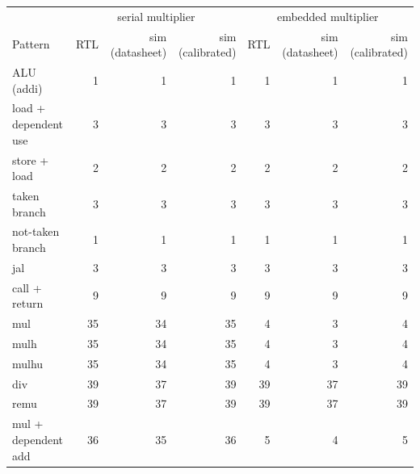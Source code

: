 \begin{tabular}{lrrrrrr}\toprule
 & \multicolumn{3}{c}{serial multiplier} & \multicolumn{3}{c}{embedded multiplier}\\
Pattern & RTL & sim (datasheet) & sim (calibrated) & RTL & sim (datasheet) & sim (calibrated)\\\midrule
ALU (addi) & 1 & 1 & 1 & 1 & 1 & 1 \\
load + dependent use & 3 & 3 & 3 & 3 & 3 & 3 \\
store + load & 2 & 2 & 2 & 2 & 2 & 2 \\
taken branch & 3 & 3 & 3 & 3 & 3 & 3 \\
not-taken branch & 1 & 1 & 1 & 1 & 1 & 1 \\
jal & 3 & 3 & 3 & 3 & 3 & 3 \\
call + return & 9 & 9 & 9 & 9 & 9 & 9 \\
mul & 35 & 34 & 35 & 4 & 3 & 4 \\
mulh & 35 & 34 & 35 & 4 & 3 & 4 \\
mulhu & 35 & 34 & 35 & 4 & 3 & 4 \\
div & 39 & 37 & 39 & 39 & 37 & 39 \\
remu & 39 & 37 & 39 & 39 & 37 & 39 \\
mul + dependent add & 36 & 35 & 36 & 5 & 4 & 5 \\
\bottomrule
\end{tabular}
